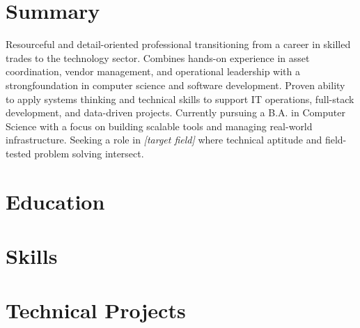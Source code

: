 \documentclass[10pt,letterpaper,sans]{moderncv}
\begin{document}
\makecvtitle

\section[\faUserTie]{Summary}
Resourceful and detail-oriented professional transitioning from a career in skilled trades to the technology sector.\newline{}
Combines hands-on experience in asset coordination, vendor management, and operational leadership with a strong\newline{}foundation
in computer science and software development. Proven ability to apply systems thinking and technical skills to support
IT operations, full-stack development, and data-driven projects. Currently pursuing a B.A. in Computer Science with a focus
on building scalable tools and managing real-world infrastructure. Seeking a role in \textit{[target field]}
where technical aptitude and field-tested problem solving intersect.

\section[\faGraduationCap]{Education}

\section[\faChess]{Skills}


\section[\faDesktop]{Technical Projects}
\end{document}
